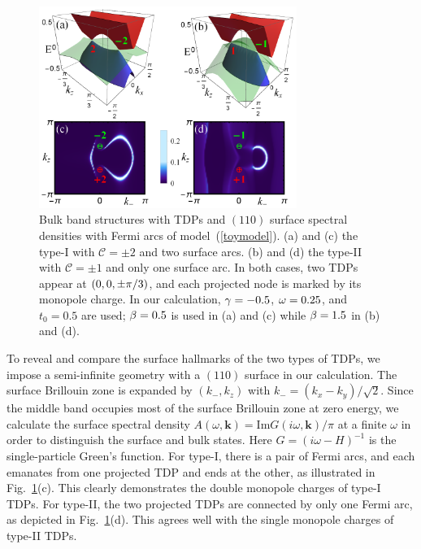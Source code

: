 \documentclass[aps,prl,floatfix,twocolumn,reprint]{revtex4}
\begin{document}
\begin{figure}[t]
\centering
\includegraphics[width=3.3in]{fig3.pdf}
\caption{Bulk band structures with TDPs and $(110)$ surface spectral
densities with Fermi arcs of model~(\protect\ref{toymodel}). 
(a) and (c) the type-I with $\mathcal{C}=\pm 2$ and two surface arcs. 
(b) and (d) the type-II with $\mathcal{C}=\pm 1$ and only one surface arc. In both
cases, two TDPs appear at $(0,0,\pm \protect\pi /3)$, and each projected
node is marked by its monopole charge. In our calculation, $\protect\gamma%
=-0.5$, $\protect\omega=0.25$, and $t_{0}=0.5$ are used; $\protect\beta =0.5$
is used in (a) and (c) while $\protect\beta =1.5$ in (b) and (d).}
\label{fig3}
\end{figure}

To reveal and compare the surface hallmarks of the two types of TDPs, we
impose a semi-infinite geometry with a $(110)$ surface in our calculation.
The surface Brillouin zone is expanded by $(k_{-},k_{z})$ with $%
k_{-}\!=\!\left( k_{x}-k_{y}\right) /\sqrt{2}$. Since the middle band
occupies most of the surface Brillouin zone at zero energy, we calculate the
surface spectral density $A(\omega ,\bm{k})\!=\!\text{Im}G(i\omega ,\bm{k}%
)/\pi $ \cite{tf1} at a finite $\omega $ in order to distinguish the surface
and bulk states. Here $G\!=\!(i\omega -H)^{-1}$ is the single-particle
Green's function. For type-I, there is a pair of Fermi arcs, 
and each emanates from one projected TDP and ends at the other, 
as illustrated in Fig.~\ref{fig3}(c). This clearly demonstrates
the double monopole charges of type-I TDPs. For type-II, the two projected
TDPs are connected by only one Fermi arc, as depicted in Fig.~\ref{fig3}(d).
This agrees well with the single monopole charges of type-II TDPs.
\end{document}
